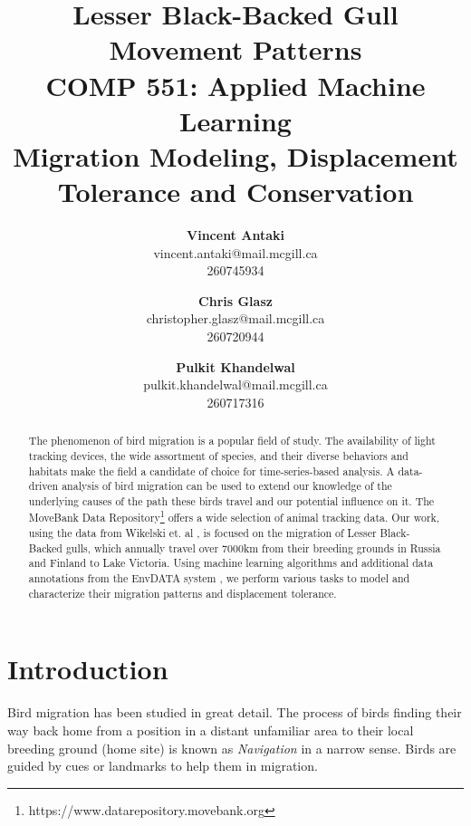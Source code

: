 \documentclass[letterpaper, 10pt, conference]{ieeeconf}  %
\begin{document}
\title{\textbf{Lesser Black-Backed Gull Movement Patterns} \\
	\Large COMP 551: Applied Machine Learning \\
	Migration Modeling, Displacement Tolerance and Conservation
}

\author{
	\textbf{Vincent Antaki}\\vincent.antaki@mail.mcgill.ca\\260745934
    \and \textbf{Chris Glasz}\\christopher.glasz@mail.mcgill.ca\\260720944
    \and \textbf{Pulkit Khandelwal}\\pulkit.khandelwal@mail.mcgill.ca\\260717316
}


\maketitle
\thispagestyle{empty}
\pagestyle{empty}

\begin{abstract}

The phenomenon of bird migration is a popular field of study. The availability of light tracking devices, the wide assortment of species, and their diverse behaviors and habitats make the field a candidate of choice for time-series-based analysis. A data-driven analysis of bird migration can be used to extend our knowledge of the underlying causes of the path these birds travel and our potential influence on it. The MoveBank Data Repository\footnote{https://www.datarepository.movebank.org} offers a wide selection of animal tracking data. Our work, using the data from Wikelski et. al \cite{navigation}, is focused on the migration of Lesser Black-Backed gulls, which annually travel over 7000km from their breeding grounds in Russia and Finland to Lake Victoria. Using machine learning algorithms and additional data annotations from the EnvDATA system \cite{envdata}, we perform various tasks to model and characterize their migration patterns and displacement tolerance.

\end{abstract}

\section{Introduction}
	Bird migration has been studied in great detail. The process of birds finding their way back home from a position in a distant unfamiliar area to their local breeding ground (home site) is known as \textit{Navigation} in a narrow sense. Birds are guided by cues or landmarks to help them in migration. 
  
\end{document}
